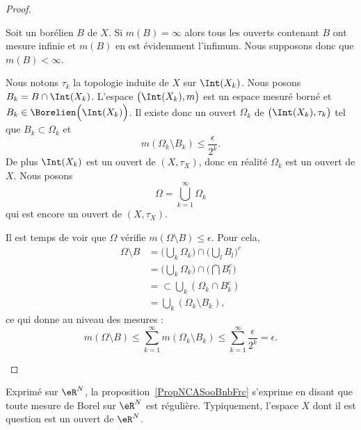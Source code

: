 \begin{proof}
\begin{subproof}

		Soit un borélien \( B\) de \( X\). Si \( m(B)=\infty\) alors tous les ouverts contenant \( B\) ont mesure infinie et \( m(B)\) en est évidemment l'infimum. Nous supposons donc que \( m(B)<\infty\).

		Nous notons \( \tau_k\) la topologie induite de \( X\) sur \( \Int(X_k)\). Nous posons \( B_k=B\cap\Int(X_k)\). L'espace \( \big( \Int(X_k),m \big)\) est un espace mesuré borné et \( B_k\in \Borelien\Big( \Int(X_k) \Big)\). Il existe donc un ouvert \( \Omega_k\) de \( \big( \Int(X_k),\tau_k \big)\) tel que \( B_k\subset \Omega_k\) et
		\begin{equation}
			m(\Omega_k\setminus B_k)\leq \frac{ \epsilon }{ 2^k }.
		\end{equation}
		De plus \( \Int(X_k)\) est un ouvert de \( (X,\tau_X)\), donc en réalité \( \Omega_k\) est un ouvert de \( X\). Nous posons
		\begin{equation}
			\Omega=\bigcup_{k=1}^{\infty}\Omega_k
		\end{equation}
		qui est encore un ouvert de \( (X,\tau_X)\).

		Il est temps de voir que \( \Omega\) vérifie \( m(\Omega\setminus B)\leq \epsilon\). Pour cela,
		\begin{subequations}
			\begin{align}
				\Omega\setminus B & =\big( \bigcup_k\Omega_k \big)\cap\big( \bigcup_lB_l \big)^c \\
				                  & =\big( \bigcup_k\Omega_k \big)\cap\big( \bigcap B_l^c \big)  \\
				                  & =\subset\bigcup_k(\Omega_k\cap B_k^c)                        \\
				                  & =\bigcup_k(\Omega_k\setminus B_k),
			\end{align}
		\end{subequations}
		ce qui donne au niveau des mesures :
		\begin{equation}
			m(\Omega\setminus B)\leq\sum_{k=1}^{\infty}m(\Omega_k\setminus B_k)\leq\sum_{k=1}^{\infty}\frac{ \epsilon }{ 2^k }=\epsilon.
		\end{equation}
	\end{subproof}
\end{proof}

\begin{remark}      \label{RemooOAGCooRHpjxd}
	Exprimé sur \( \eR^N\), la proposition~\ref{PropNCASooBnbFrc} s'exprime en disant que toute mesure de Borel sur \( \eR^N\) est régulière. Typiquement, l'espace \( X\) dont il est question est un ouvert de \( \eR^N\).
\end{remark}

